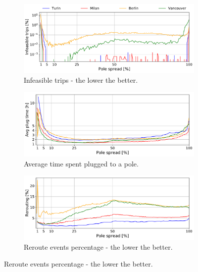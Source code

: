 \begin{figure}[t!]
    \begin{center}
        \begin{subfigure}{0.49\textwidth}
            \includegraphics[width=\columnwidth]{figures/50_Deaths_vsZones_ACS}
            \caption{Infeasible trips - the lower the better.}
            \label{fig:zoneACS_vs_IT}
        \end{subfigure}
                  \begin{subfigure}{0.49\textwidth}
            \includegraphics[width=\columnwidth]{figures/50_AvgTimeInStation_vsZones_ACS.pdf}
             \caption{Average time spent plugged to a pole.}
             \label{fig:zoneACS_vs_plug}
         \end{subfigure}        
           \begin{subfigure}{0.49\textwidth}
            \includegraphics[width=\columnwidth]{figures/50_ReroutePerc_vsZones_ACS}
             \caption{Reroute events percentage - the lower the better.}

\end{subfigure}
\end{center}
\end{figure}
